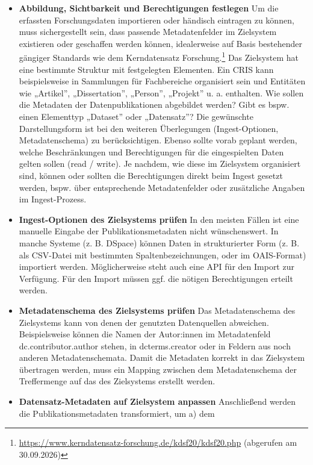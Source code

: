 \documentclass[
  ngerman,
  letterpaper,
  DIV=11]{scrreprt}
\providecommand{\tightlist}{%
  \setlength{\itemsep}{0pt}\setlength{\parskip}{0pt}}
\begin{document}
\begin{itemize}
\tightlist
\item
  \textbf{Abbildung, Sichtbarkeit und Berechtigungen festlegen} Um die
  erfassten Forschungsdaten importieren oder händisch eintragen zu
  können, muss sichergestellt sein, dass passende Metadatenfelder im
  Zielsystem existieren oder geschaffen werden können, idealerweise auf
  Basis bestehender gängiger Standards wie dem Kerndatensatz
  Forschung.\footnote{\url{https://www.kerndatensatz-forschung.de/kdsf20/kdsf20.php}
    (abgerufen am 30.09.2026)} Das Zielsystem hat eine bestimmte
  Struktur mit festgelegten Elementen. Ein CRIS kann beispielsweise in
  Sammlungen für Fachbereiche organisiert sein und Entitäten wie
  „Artikel'', „Dissertation'', „Person'', „Projekt'' u. a. enthalten.
  Wie sollen die Metadaten der Datenpublikationen abgebildet werden?
  Gibt es bspw. einen Elementtyp „Dataset'' oder „Datensatz''? Die
  gewünschte Darstellungsform ist bei den weiteren Überlegungen
  (Ingest-Optionen, Metadatenschema) zu berücksichtigen. Ebenso sollte
  vorab geplant werden, welche Beschränkungen und Berechtigungen für die
  eingespielten Daten gelten sollen (read / write). Je nachdem, wie
  diese im Zielsystem organisiert sind, können oder sollten die
  Berechtigungen direkt beim Ingest gesetzt werden, bspw. über
  entsprechende Metadatenfelder oder zusätzliche Angaben im
  Ingest-Prozess.
\item
  \textbf{Ingest-Optionen des Zielsystems prüfen} In den meisten Fällen
  ist eine manuelle Eingabe der Publikationsmetadaten nicht
  wünschenswert. In manche Systeme (z. B. DSpace) können Daten in
  strukturierter Form (z. B. als CSV-Datei mit bestimmten
  Spaltenbezeichnungen, oder im OAIS-Format) importiert werden.
  Möglicherweise steht auch eine API für den Import zur Verfügung. Für
  den Import müssen ggf. die nötigen Berechtigungen erteilt werden.
\item
  \textbf{Metadatenschema des Zielsystems prüfen} Das Metadatenschema
  des Zielsystems kann von denen der genutzten Datenquellen abweichen.
  Beispielsweise können die Namen der Autor:innen im Metadatenfeld
  dc.contributor.author stehen, in dcterms.creator oder in Feldern aus
  noch anderen Metadatenschemata. Damit die Metadaten korrekt in das
  Zielsystem übertragen werden, muss ein Mapping zwischen dem
  Metadatenschema der Treffermenge auf das des Zielsystems erstellt
  werden.
\item
  \textbf{Datensatz-Metadaten auf Zielsystem anpassen} Anschließend
  werden die Publikationsmetadaten transformiert, um a) dem

\end{itemize}
\end{document}
